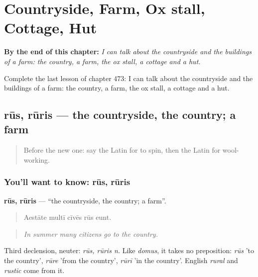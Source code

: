 
\chapter{Countryside, Farm, Ox stall, Cottage, Hut}
\label{ch:la-countryside-farm-ox-stall-cottage-hut}

\begin{chapteropening}
\textbf{By the end of this chapter:} \emph{I can talk about the countryside and the buildings of a farm: the country, a farm, the ox stall, a cottage and a hut.}

Complete the last lesson of chapter 473: I can talk about the countryside and the buildings of a farm: the country, a farm, the ox stall, a cottage and a hut.
\end{chapteropening}

\section[rūs, rūris]{rūs, rūris — the countryside, the country; a farm}

\label{lesson:LA-C473-rus}



\begin{quote}
Before the new one: say the Latin for to spin, then the Latin for wool-working.
\end{quote}

\subsection*{You'll want to know: rūs, rūris}
\textbf{rūs, rūris} — \textquotedblleft{}the countryside, the country; a farm\textquotedblright{}.

\begin{quote}
Aestāte multī cīvēs rūs eunt.
\end{quote}

\begin{quote}
\emph{In summer many citizens go to the country.}
\end{quote}

Third declension, neuter: \emph{rūs, rūris n.} Like \emph{domus}, it takes no preposition: \emph{rūs} 'to the country', \emph{rūre} 'from the country', \emph{rūrī} 'in the country'. English \emph{rural} and \emph{rustic} come from it.

